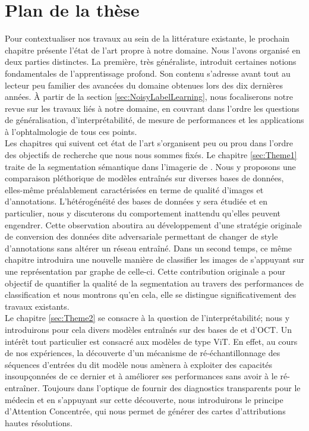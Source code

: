 \section{Plan de la thèse}  %
Pour contextualiser nos travaux au sein de la littérature existante, le prochain chapitre présente l'état de l'art propre à notre domaine. Nous l'avons organisé en deux parties distinctes. La première, très généraliste, introduit certaines notions fondamentales de l'apprentissage profond. Son contenu s'adresse avant tout au lecteur peu familier des avancées du domaine obtenues lors des dix dernières années. À partir de la section \ref{sec:NoisyLabelLearning}, nous focaliserons notre revue sur les travaux liés à notre domaine, en couvrant dans l'ordre les questions de généralisation, d'interprétabilité, de mesure de performances et les applications à l'ophtalmologie de tous ces points. \\
Les chapitres qui suivent cet état de l'art s'organisent peu ou prou dans l'ordre des objectifs de recherche que nous nous sommes fixés. Le chapitre \ref{sec:Theme1} traite de la segmentation sémantique dans l'imagerie de \fundus{}. Nous y proposons une comparaison pléthorique de modèles entraînés sur diverses bases de données, elles-même préalablement caractérisées en terme de qualité d'images et d'annotations. L'hétérogénéité des bases de données y sera étudiée et en particulier, nous y discuterons du comportement inattendu qu'elles peuvent engendrer. Cette observation aboutira au développement d'une stratégie originale de conversion des données dite \og adversariale \fg permettant de changer de style d'annotations sans altérer un réseau entraîné.
Dans un second temps, ce même chapitre introduira une nouvelle manière de classifier les images de \fundus{} s'appuyant sur une représentation par graphe de celle-ci. Cette contribution originale a pour objectif de quantifier la qualité de la segmentation au travers des performances de classification et nous montrons qu'en cela, elle se distingue significativement des travaux existants. \\
Le chapitre \ref{sec:Theme2} se consacre à la question de l'interprétabilité; nous y introduirons pour cela divers modèles entraînés sur des bases de \fundus{} et d'OCT. Un intérêt tout particulier est consacré aux modèles de type ViT. En effet, au cours de nos expériences, la découverte d'un mécanisme de ré-échantillonnage des séquences d'entrées du dit modèle nous amènera à exploiter des capacités insoupçonnées de ce dernier et à améliorer ses performances sans avoir à le ré-entraîner. Toujours dans l'optique de fournir des diagnostics transparents pour le médecin et en s'appuyant sur cette découverte, nous introduirons le principe d'Attention Concentrée, qui nous permet de générer des cartes d'attributions hautes résolutions. \\
